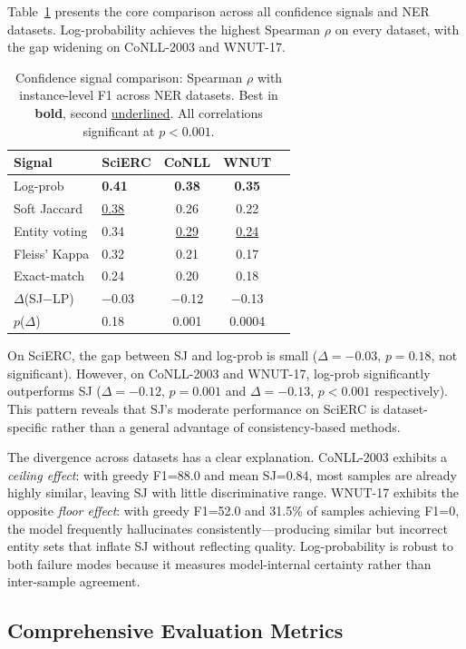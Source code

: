 \documentclass[11pt,a4paper]{article}
\begin{document}
Table~\ref{tab:main_comparison} presents the core comparison across all confidence signals and NER datasets. Log-probability achieves the highest Spearman $\rho$ on every dataset, with the gap widening on CoNLL-2003 and WNUT-17.

\begin{table}[t]
\centering
\small
\caption{Confidence signal comparison: Spearman $\rho$ with instance-level F1 across NER datasets. Best in \textbf{bold}, second \underline{underlined}. All correlations significant at $p<0.001$.}
\label{tab:main_comparison}
\begin{tabular}{llccc}
\toprule
Signal & SciERC & CoNLL & WNUT \\
\midrule
Log-prob       & \textbf{0.41} & \textbf{0.38} & \textbf{0.35} \\
Soft Jaccard   & \underline{0.38} & 0.26 & 0.22 \\
Entity voting  & 0.34 & \underline{0.29} & \underline{0.24} \\
Fleiss' Kappa  & 0.32 & 0.21 & 0.17 \\
Exact-match    & 0.24 & 0.20 & 0.18 \\
\midrule
$\Delta$(SJ$-$LP) & $-$0.03 & $-$0.12 & $-$0.13 \\
$p$($\Delta$)  & 0.18 & 0.001 & 0.0004 \\
\bottomrule
\end{tabular}
\end{table}

On SciERC, the gap between SJ and log-prob is small ($\Delta=-0.03$, $p=0.18$, not significant). However, on CoNLL-2003 and WNUT-17, log-prob significantly outperforms SJ ($\Delta=-0.12$, $p=0.001$ and $\Delta=-0.13$, $p<0.001$ respectively). This pattern reveals that SJ's moderate performance on SciERC is dataset-specific rather than a general advantage of consistency-based methods.

The divergence across datasets has a clear explanation. CoNLL-2003 exhibits a \emph{ceiling effect}: with greedy F1=88.0 and mean SJ=0.84, most samples are already highly similar, leaving SJ with little discriminative range. WNUT-17 exhibits the opposite \emph{floor effect}: with greedy F1=52.0 and 31.5\% of samples achieving F1=0, the model frequently hallucinates consistently---producing similar but incorrect entity sets that inflate SJ without reflecting quality. Log-probability is robust to both failure modes because it measures model-internal certainty rather than inter-sample agreement.

\subsection{Comprehensive Evaluation Metrics}
\end{document}
